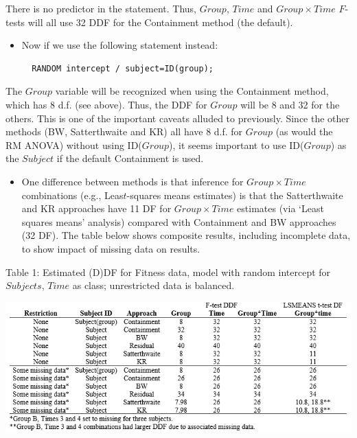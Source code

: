\documentclass[
  9pt,
  ignorenonframetext,
]{beamer}
\providecommand{\tightlist}{%
  \setlength{\itemsep}{0pt}\setlength{\parskip}{0pt}}
\begin{document}
\begin{frame}[fragile]{}
\protect\hypertarget{section-1}{}
There is no predictor in the statement. Thus, \(Group\), \(Time\) and
\(Group \times Time\) \(F\)-tests will all use 32 DDF for the
Containment method (the default).

\begin{itemize}
\item
  Now if we use the following statement instead:

\begin{verbatim}
  RANDOM intercept / subject=ID(group);
\end{verbatim}
\end{itemize}

The \(Group\) variable will be recognized when using the Containment
method, which has 8 d.f. (see above). Thus, the DDF for \(Group\) will
be 8 and 32 for the others. This is one of the important caveats alluded
to previously. Since the other methods (BW, Satterthwaite and KR) all
have 8 d.f. for \(Group\) (as would the RM ANOVA) without using
ID(\(Group\)), it seems important to use ID(\(Group\)) as the
\(Subject\) if the default Containment is used.

\begin{itemize}
\tightlist
\item
  One difference between methods is that inference for
  \(Group \times Time\) combinations (e.g., Leas\(t\)-squares means
  estimates) is that the Satterthwaite and KR approaches have 11 DF for
  \(Group \times Time\) estimates (via `Least squares means' analysis)
  compared with Containment and BW approaches (32 DF). The table below
  shows composite results, including incomplete data, to show impact of
  missing data on results.
\end{itemize}
\end{frame}

\begin{frame}{}
\protect\hypertarget{section-2}{}
\begin{block}{Table 1: Estimated (D)DF for Fitness data, model with
random intercept for \(Subjects\), \(Time\) as class; unrestricted data
is balanced.}
\protect\hypertarget{table-1-estimated-ddf-for-fitness-data-model-with-random-intercept-for-subjects-time-as-class-unrestricted-data-is-balanced.}{}
\begin{center}\includegraphics[width=1\linewidth]{figs_L6/t1} \end{center}
\end{block}
\end{frame}
\end{document}
